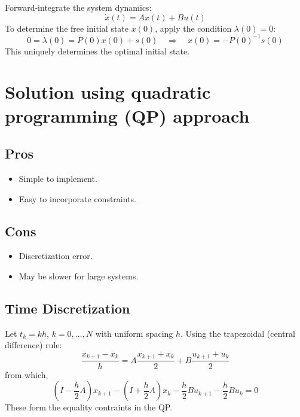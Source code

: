 \documentclass[11pt]{article}
\begin{document}
Forward-integrate the system dynamics:
\begin{equation}
\dot{x}(t) = A x(t) + B u(t)
\end{equation}
To determine the free initial state \(x(0)\), apply the condition \(\lambda(0) = 0\):
\begin{equation}
0 = \lambda(0) = P(0)x(0) + s(0) \quad \Rightarrow \quad x(0) = -P(0)^{-1} s(0)
\end{equation}
This uniquely determines the optimal initial state.

\section{Solution using quadratic programming (QP) approach}

\subsection*{Pros}
\begin{itemize}[noitemsep]
    \item Simple to implement.
    \item Easy to incorporate constraints.
\end{itemize}

\subsection*{Cons}
\begin{itemize}[noitemsep]
    \item Discretization error.
    \item May be slower for large systems.
\end{itemize}

\subsection*{Time Discretization}

Let $t_k = kh$, $k = 0, \dots, N$ with uniform spacing $h$. 
Using the trapezoidal (central difference) rule:
\begin{equation*}
    \frac{x_{k+1}-x_k}{h} = A\frac{x_{k+1}+x_k}{2} + B\frac{u_{k+1}+u_k}{2}
\end{equation*}
from which,
\begin{equation*}
    \left(I - \frac{h}{2}A\right)x_{k+1} - \left(I + \frac{h}{2}A\right)x_k - \frac{h}{2}Bu_{k+1} - \frac{h}{2}Bu_k = 0
\end{equation*}
These form the equality contraints in the QP.
\end{document}
